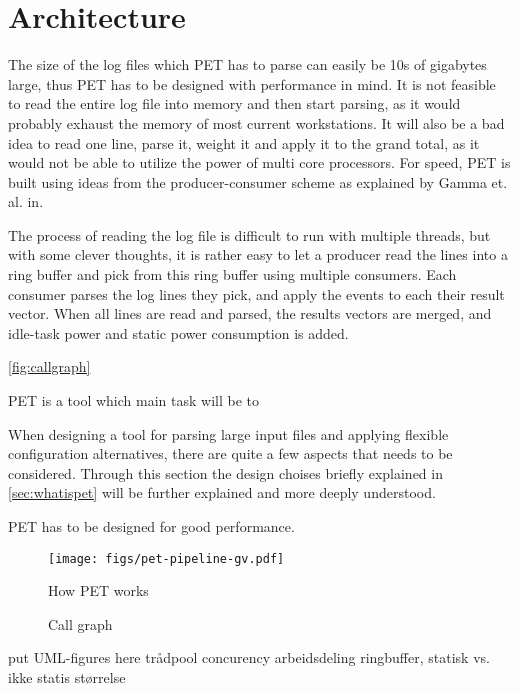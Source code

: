 \section{Architecture}

The size of the log files which PET has to parse can easily be 10s of gigabytes
large, thus PET has to be designed with performance in mind. It is not feasible
to read the entire log file into memory and then start parsing, as it would
probably exhaust the memory of most current workstations. It will also be a bad
idea to read one line, parse it, weight it and apply it to the grand total, as
it would not be able to utilize the power of multi core processors. For speed,
PET is built using ideas from the producer-consumer scheme as explained by Gamma
et. al. in\cite{designpatterns}.

The process of reading the log file is difficult to run with multiple threads, but
with some clever thoughts, it is rather easy to let a producer read the lines into a ring buffer
and pick from this ring buffer using multiple consumers. Each consumer parses the log lines
they pick, and apply the events to each their result vector. When all lines are read and parsed,
the results vectors are merged, and idle-task power and static power consumption is added.

\autoref{fig:callgraph}


PET is a tool which main task will be to 

When designing a tool for parsing large input files and applying flexible configuration alternatives,
there are quite a few aspects that needs to be considered. Through this section the design choises
briefly explained in \autoref{sec:whatispet} will be further explained and more deeply understood.

PET has to be designed for good performance.


\begin{figure}
    \texttt{[image: figs/pet-pipeline-gv.pdf]}
    \caption{How PET works}
    \label{fig:pipeline}
\end{figure}

\begin{figure}
    {\tiny }
    \caption{Call graph}
    \label{fig:callgraph}
\end{figure}

put UML-figures here
trådpool
concurency
arbeidsdeling
ringbuffer, statisk vs. ikke statis størrelse




